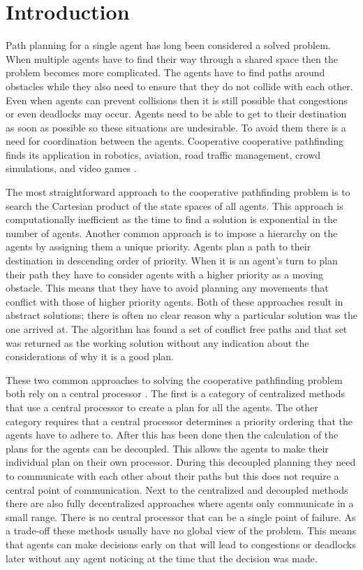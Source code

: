 \section{Introduction}\label{sec:intro}
Path planning for a single agent has long been considered a solved problem.
When multiple agents have to find their way through a shared space then the
problem becomes more complicated. The agents have to find paths around
obstacles while they also need to ensure that they do not collide with each
other. Even when agents can prevent collisions then it is still possible that
congestions or even deadlocks may occur. Agents need to be able to get to their
destination as soon as possible so these situations are undesirable. To avoid
them there is a need for coordination between the agents. Cooperative
cooperative pathfinding finds its application in robotics, aviation, road
traffic management, crowd simulations, and video games \cite{standley2011}.

The most straightforward approach to the cooperative pathfinding problem
is to search the Cartesian product of the state spaces of all agents. This
approach is computationally inefficient \cite{sharon2013} as the time to find a
solution is exponential in the number of agents. Another common approach is to
impose a hierarchy on the agents by assigning them a unique priority. Agents
plan a path to their destination in descending order of priority. When it is an
agent's turn to plan their path they have to consider agents with a higher
priority as a moving obstacle. This means that they have to avoid planning any
movements that conflict with those of higher priority agents. Both of these
approaches result in abstract solutions; there is often no clear reason why a
particular solution was the one arrived at. The algorithm has found a set of
conflict free paths and that set was returned as the working solution without
any indication about the considerations of why it is a good plan.

These two common approaches to solving the cooperative pathfinding problem both
rely on a central processor \cite{chouhan2017}. The first is a category of
centralized methods that use a central processor to create a plan for all the
agents. The other category requires that a central processor determines a
priority ordering that the agents have to adhere to. After this has been done
then the calculation of the plans for the agents can be decoupled. This allows
the agents to make their individual plan on their own processor. During this
decoupled planning they need to communicate with each other about their paths
but this does not require a central point of communication. Next to the
centralized and decoupled methods there are also fully decentralized approaches
where agents only communicate in a small range. There is no central processor
that can be a single point of failure. As a trade-off these methods usually
have no global view of the problem. This means that agents can make decisions
early on that will lead to congestions or deadlocks later without any agent
noticing at the time that the decision was made.


